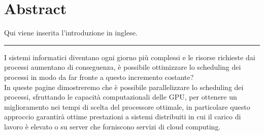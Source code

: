 \chapter*{Abstract}
Qui viene inserita l'introduzione in inglese.
\vspace{50pt}
\hrule
\vspace{50pt}
I sistemi informatici diventano ogni giorno più complessi e le risorse richieste dai processi aumentano di conseguenza, è possibile ottimizzare lo scheduling dei processi in modo da far fronte a questo incremento costante?\\
In queste pagine dimostreremo che è possibile parallelizzare lo scheduling dei processi, sfruttando le capacità computazionali delle GPU, per ottenere un miglioramento nei tempi di scelta del processore ottimale, in particolare questo approccio garantirà ottime prestazioni a sistemi distribuiti in cui il carico di lavoro è elevato o su server che forniscono servizi di cloud computing.